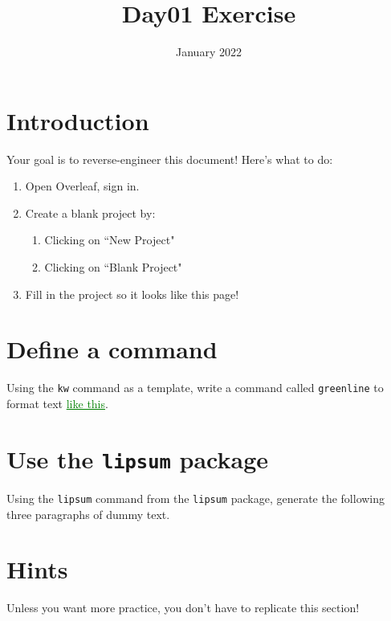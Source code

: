 \documentclass[twocolumn]{article}
\title{Day01 Exercise}
\date{January 2022}
\newcommand\greenline[1]{\textcolor{green}{\underline{#1}}}
\begin{document}
\maketitle

\section{Introduction} \label{sec:intro}

Your goal is to reverse-engineer this document! Here's what to do:

\begin{enumerate}
    \item Open Overleaf, sign in.
    \item Create a blank project by:
    \begin{enumerate}
        \item Clicking on ``New Project" 
        \item Clicking on ``Blank Project"
    \end{enumerate}
    \item Fill in the project so it looks like this page!
\end{enumerate}

\section{Define a command} \label{sec:command}

Using the \texttt{kw} command as a template, write a command called \texttt{greenline} to format text \greenline{like this}.

\section{Use the \texttt{lipsum} package} \label{sec:package}

Using the \texttt{lipsum} command from the \texttt{lipsum} package, generate the following three paragraphs of dummy text.

\lipsum[1-3]

\section{Hints}

Unless you want more practice, you don't have to replicate this section!
\end{document}
